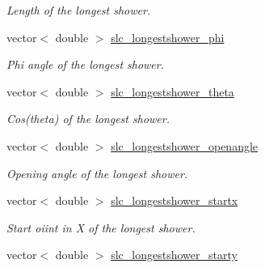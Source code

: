 \begin{DoxyCompactItemize}
\begin{DoxyCompactList}\small\item\em Length of the longest shower. \end{DoxyCompactList}\item 
\hypertarget{classUBXSecEvent_a5a3961829584867de2538496f6714f15}{vector$<$ double $>$ \hyperlink{classUBXSecEvent_a5a3961829584867de2538496f6714f15}{slc\-\_\-longestshower\-\_\-phi}}\label{classUBXSecEvent_a5a3961829584867de2538496f6714f15}

\begin{DoxyCompactList}\small\item\em Phi angle of the longest shower. \end{DoxyCompactList}\item 
\hypertarget{classUBXSecEvent_a92343d49ea8b95aebf4a8710b0caf8b1}{vector$<$ double $>$ \hyperlink{classUBXSecEvent_a92343d49ea8b95aebf4a8710b0caf8b1}{slc\-\_\-longestshower\-\_\-theta}}\label{classUBXSecEvent_a92343d49ea8b95aebf4a8710b0caf8b1}

\begin{DoxyCompactList}\small\item\em Cos(theta) of the longest shower. \end{DoxyCompactList}\item 
\hypertarget{classUBXSecEvent_ad53e2bf33ff69e69c60443f12b6ed9e6}{vector$<$ double $>$ \hyperlink{classUBXSecEvent_ad53e2bf33ff69e69c60443f12b6ed9e6}{slc\-\_\-longestshower\-\_\-openangle}}\label{classUBXSecEvent_ad53e2bf33ff69e69c60443f12b6ed9e6}

\begin{DoxyCompactList}\small\item\em Opening angle of the longest shower. \end{DoxyCompactList}\item 
\hypertarget{classUBXSecEvent_a4bbe4dd480325e85cb3a51a018651cf2}{vector$<$ double $>$ \hyperlink{classUBXSecEvent_a4bbe4dd480325e85cb3a51a018651cf2}{slc\-\_\-longestshower\-\_\-startx}}\label{classUBXSecEvent_a4bbe4dd480325e85cb3a51a018651cf2}

\begin{DoxyCompactList}\small\item\em Start oiint in X of the longest shower. \end{DoxyCompactList}\item 
\hypertarget{classUBXSecEvent_a8fc3be7a9c40664b2615ca8c079c05c9}{vector$<$ double $>$ \hyperlink{classUBXSecEvent_a8fc3be7a9c40664b2615ca8c079c05c9}{slc\-\_\-longestshower\-\_\-starty}}\label{classUBXSecEvent_a8fc3be7a9c40664b2615ca8c079c05c9}


\end{DoxyCompactItemize}
